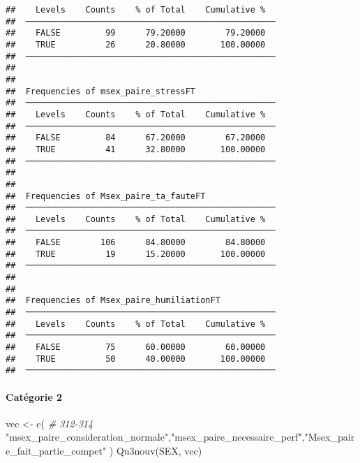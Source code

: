 \documentclass[
]{article}
\newenvironment{Shaded}{\begin{snugshade}}{\end{snugshade}}
\newcommand{\CommentTok}[1]{\textcolor[rgb]{0.56,0.35,0.01}{\textit{#1}}}
\newcommand{\FunctionTok}[1]{\textcolor[rgb]{0.00,0.00,0.00}{#1}}
\newcommand{\NormalTok}[1]{#1}
\newcommand{\OtherTok}[1]{\textcolor[rgb]{0.56,0.35,0.01}{#1}}
\newcommand{\StringTok}[1]{\textcolor[rgb]{0.31,0.60,0.02}{#1}}
\begin{document}
\begin{verbatim}
##    Levels    Counts    % of Total    Cumulative %   
##  ────────────────────────────────────────────────── 
##    FALSE         99      79.20000        79.20000   
##    TRUE          26      20.80000       100.00000   
##  ────────────────────────────────────────────────── 
## 
## 
##  Frequencies of msex_paire_stressFT                 
##  ────────────────────────────────────────────────── 
##    Levels    Counts    % of Total    Cumulative %   
##  ────────────────────────────────────────────────── 
##    FALSE         84      67.20000        67.20000   
##    TRUE          41      32.80000       100.00000   
##  ────────────────────────────────────────────────── 
## 
## 
##  Frequencies of Msex_paire_ta_fauteFT               
##  ────────────────────────────────────────────────── 
##    Levels    Counts    % of Total    Cumulative %   
##  ────────────────────────────────────────────────── 
##    FALSE        106      84.80000        84.80000   
##    TRUE          19      15.20000       100.00000   
##  ────────────────────────────────────────────────── 
## 
## 
##  Frequencies of Msex_paire_humiliationFT            
##  ────────────────────────────────────────────────── 
##    Levels    Counts    % of Total    Cumulative %   
##  ────────────────────────────────────────────────── 
##    FALSE         75      60.00000        60.00000   
##    TRUE          50      40.00000       100.00000   
##  ──────────────────────────────────────────────────
\end{verbatim}

\hypertarget{catuxe9gorie-2-3}{%
\paragraph{Catégorie 2}\label{catuxe9gorie-2-3}}

\begin{Shaded}
\begin{Highlighting}[]
\NormalTok{vec }\OtherTok{\textless{}{-}} \FunctionTok{c}\NormalTok{(   }\CommentTok{\# 312{-}314}
  \StringTok{"msex\_paire\_consideration\_normale"}\NormalTok{,}\StringTok{"msex\_paire\_necessaire\_perf"}\NormalTok{,}\StringTok{"Msex\_paire\_fait\_partie\_compet"}
\NormalTok{)}
\FunctionTok{Qu3nouv}\NormalTok{(SEX, vec)}
\end{Highlighting}
\end{Shaded}
\end{document}
